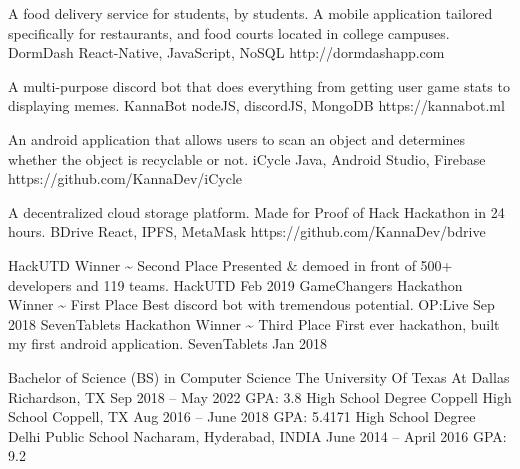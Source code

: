 \documentclass[]{awesome-cv}
\begin{document}
\vspace{-7mm}
\begin{cventries}
	\cventry
	{A food delivery service for students, by students. A mobile application tailored specifically for restaurants, and food courts located in college campuses.}
	{DormDash}
	{React-Native, JavaScript, NoSQL}
	{http://dormdashapp.com}
	{}
	
	\vspace{-5mm}
	\cventry
	{A multi-purpose discord bot that does everything from getting user game stats to displaying memes.}
	{KannaBot}
	{nodeJS, discordJS, MongoDB}
	{https://kannabot.ml}
	{}
	
	\vspace{-5mm}
	\cventry
	{An android application that allows users to scan an object and determines whether the object is recyclable or not.}
	{iCycle}
	{Java, Android Studio, Firebase}
	{https://github.com/KannaDev/iCycle}
	{}
	
	\vspace{-5mm}
	\cventry
	{A decentralized cloud storage platform. Made for Proof of Hack Hackathon in 24 hours.}
	{BDrive}
	{React, IPFS, MetaMask}
	{https://github.com/KannaDev/bdrive}
	{}
	
	\vspace{-5mm}
\end{cventries}
\begin{cvhonors}
	\cvhonor
	{HackUTD Winner \textasciitilde{} Second Place}
	{Presented \& demoed in front of 500+ developers and 119 teams.}
	{HackUTD}
	{Feb 2019}
	\cvhonor
	{GameChangers Hackathon Winner \textasciitilde{} First Place}
	{Best discord bot with tremendous potential.}
	{OP:Live}
	{Sep 2018}
	\cvhonor
	{SevenTablets Hackathon Winner \textasciitilde{} Third Place}
	{First ever hackathon, built my first android application.}
	{SevenTablets}
	{Jan 2018}
\end{cvhonors}
\begin{cventries}
	\cventry
	{Bachelor of Science (BS) in Computer Science}
	{The University Of Texas At Dallas}
	{Richardson, TX}
	{Sep 2018 – May 2022}
	{GPA: 3.8}
	\cventry
	{High School Degree}
	{Coppell High School}
	{Coppell, TX}
	{Aug 2016 – June 2018}
	{GPA: 5.4171}
	\cventry
	{High School Degree}
	{Delhi Public School}
	{Nacharam, Hyderabad, INDIA}
	{June 2014 – April 2016}
	{GPA: 9.2}
\end{cventries}

\vspace{-2mm}
\ 
\end{document}
